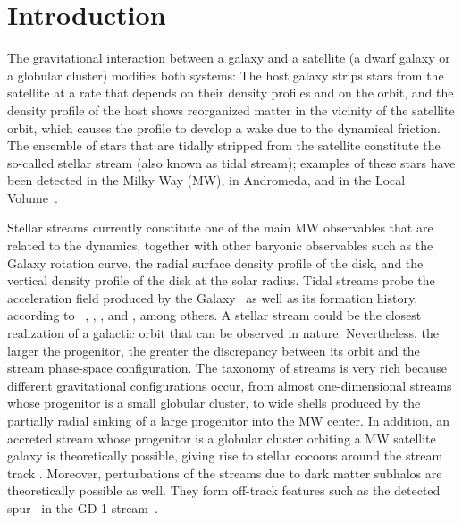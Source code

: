 \documentclass[referee]{aa} %
\begin{document}
\section{Introduction}
The gravitational interaction between a galaxy and a satellite (a dwarf galaxy or a globular cluster) modifies both systems: The host galaxy strips stars from the satellite at a rate
that depends on their density profiles and on the orbit,
and the density profile of the host shows reorganized matter in the vicinity of the satellite orbit, which causes the profile to develop a wake due to the dynamical friction.
The ensemble of stars that are tidally stripped from the satellite constitute the so-called stellar stream (also known as tidal stream); examples of these stars have been detected in the Milky Way (MW), in Andromeda, and in the Local Volume~\citep{Martínez-Delgado_2010}.

Stellar streams currently constitute one of the main MW observables that are related to the dynamics, together with other baryonic observables such as the Galaxy rotation curve, the radial surface density profile of the disk, and the vertical density profile of the disk at the solar radius.
Tidal streams probe the acceleration field produced by the Galaxy~\citep{1999ApJ...512L.109J,1999A&A...348L..49Z,2009ApJ...703L..67L,2013MNRAS.436.2386L,2016ASSL..420..169J,Ibata_2016,2017ApJ...842..120I,2017A&A...603A..65T,2021MNRAS.502.4170R} as well as its formation history, according to ~\citet{1999Natur.402...53H}, \citet{2020ARA&A..58..205H}, \citet{2022A&A...666A..64R}, and \citet{2023arXiv230708730C}, among others.
A stellar stream could be the closest realization of a galactic orbit that can be observed in nature.
Nevertheless, the larger the progenitor, the greater the discrepancy between its orbit and the stream phase-space configuration. The taxonomy of streams is very rich \citep{2015MNRAS.450..575A} because different gravitational configurations occur, from almost one-dimensional streams whose progenitor is a small globular cluster, to wide shells produced by the partially radial sinking of a large progenitor into the MW center. In addition, an accreted stream whose progenitor is a globular cluster orbiting a MW satellite galaxy is theoretically possible, giving rise to stellar cocoons around the
stream track \citep{2018ApJ...861...69C,2019ApJ...881..106M,2021MNRAS.501..179M,2021ApJ...911L..32G,2022MNRAS.511.2339Q}.
Moreover, perturbations of the streams due to dark matter subhalos are theoretically possible as well. They form off-track features such as the detected spur~\citep{Price-Whelan_2018} in
the GD-1 stream~\citep{Grillmair_2006}.
\end{document}
